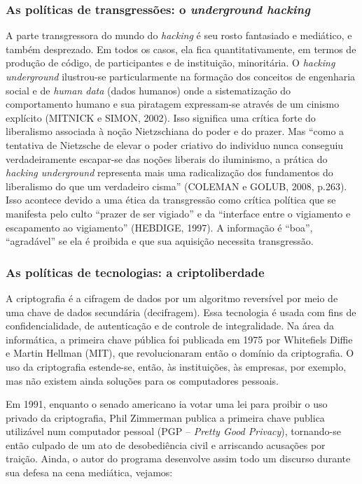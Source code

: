 \subsubsection{As políticas de transgressões: o \emph{underground hacking}} \label{2.2.2.a}

A parte transgressora do mundo do \emph{hacking} é seu rosto fantasiado e mediático, e também desprezado. Em todos os casos, ela fica quantitativamente, em termos de produção de código, de participantes e de instituição, minoritária. O \emph{hacking underground} ilustrou-se particularmente na formação dos conceitos de engenharia social e de \emph{human data} (dados humanos) onde a sistematização do comportamento humano e sua piratagem expressam-se através de um cinismo explícito (MITNICK e SIMON, 2002). Isso significa uma crítica forte do liberalismo associada à noção Nietzschiana do poder e do prazer. Mas “como a tentativa de Nietzsche de elevar o poder criativo do individuo nunca conseguiu verdadeiramente escapar-se das noções liberais do iluminismo, a prática do \emph{hacking underground} representa mais uma radicalização dos fundamentos do liberalismo do que um verdadeiro cisma” (COLEMAN e GOLUB, 2008, p.263). Isso acontece devido a uma ética da transgressão como crítica política que se manifesta pelo culto “prazer de ser vigiado” e da “interface entre o vigiamento e escapamento ao vigiamento” (HEBDIGE, 1997). A informação é “boa”, “agradável” se ela é proibida e que sua aquisição necessita transgressão.

\subsubsection{As políticas de tecnologias: a criptoliberdade} \label{2.2.2.b}

A criptografia é a cifragem de dados por um algoritmo reversível por meio de uma chave de dados secundária (decifragem). Essa tecnologia é usada com fins de confidencialidade, de autenticação e de controle de integralidade. Na área da informática, a primeira chave pública foi publicada em 1975 por Whitefiels Diffie e Martin Hellman (MIT), que revolucionaram então o domínio da criptografia. O uso da criptografia estende-se, então, às instituições, às empresas, por exemplo, mas não existem ainda soluções para os computadores pessoais.

Em 1991, enquanto o senado americano ia votar uma lei para proibir o uso privado da criptografia, Phil Zimmerman publica a primeira chave publica utilizável num computador pessoal (PGP – \emph{Pretty Good Privacy}), tornando-se então culpado de um ato de desobediência civil e arriscando acusações por traição. Ainda, o autor do programa desenvolve assim todo um discurso durante sua defesa na cena mediática, vejamos:

